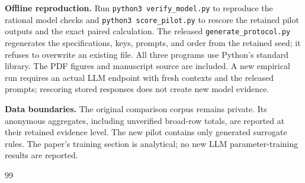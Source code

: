 \documentclass[11pt,letterpaper]{article}
\theoremstyle{definition}\newtheorem{definition}[theorem]{Definition}
\begin{document}
\textbf{Offline reproduction.} Run \texttt{python3 verify\_model.py} to reproduce the rational model checks and \texttt{python3 score\_pilot.py} to rescore the retained pilot outputs and the exact paired calculation. The released \texttt{generate\_protocol.py} regenerates the specifications, keys, prompts, and order from the retained seed; it refuses to overwrite an existing file. All three programs use Python's standard library. The PDF figures and manuscript source are included. A new empirical run requires an actual LLM endpoint with fresh contexts and the released prompts; rescoring stored responses does not create new model evidence.

\textbf{Data boundaries.} The original comparison corpus remains private. Its anonymous aggregates, including unverified broad-row totals, are reported at their retained evidence level. The new pilot contains only generated surrogate rules. The paper's training section is analytical; no new LLM parameter-training results are reported.

\clearpage
\begin{thebibliography}{99}

\end{thebibliography}
\end{document}
